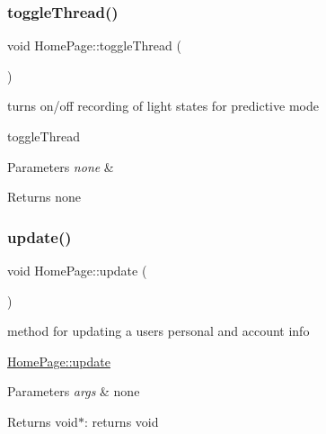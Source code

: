 \subsubsection{\texorpdfstring{toggle\+Thread()}{toggleThread()}}
{\footnotesize\ttfamily void Home\+Page\+::toggle\+Thread (\begin{DoxyParamCaption}{ }\end{DoxyParamCaption})\hspace{0.3cm}{\ttfamily [private]}}



turns on/off recording of light states for predictive mode 

toggle\+Thread 
\begin{DoxyParams}{Parameters}
{\em none} & \\
\hline
\end{DoxyParams}
\begin{DoxyReturn}{Returns}
none 
\end{DoxyReturn}
\mbox{\label{class_home_page_a4dd93ce31ced15fd70992fe6ef67d28b}} 
\subsubsection{\texorpdfstring{update()}{update()}}
{\footnotesize\ttfamily void Home\+Page\+::update (\begin{DoxyParamCaption}{ }\end{DoxyParamCaption})\hspace{0.3cm}{\ttfamily [private]}}



method for updating a user\textquotesingle{}s personal and account info 

\hyperlink{class_home_page_a4dd93ce31ced15fd70992fe6ef67d28b}{Home\+Page\+::update} 
\begin{DoxyParams}{Parameters}
{\em args} & none \\
\hline
\end{DoxyParams}
\begin{DoxyReturn}{Returns}
void$\ast$\+: returns void 
\end{DoxyReturn}
\mbox{\label{class_home_page_a0231c983e866ff4f574d9f26cac7c944}} 
